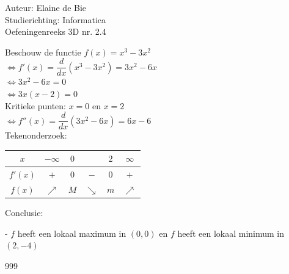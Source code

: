 \documentclass[a4paper]{article}
\begin{document}
  
\noindent \large Auteur: Elaine de Bie \\
\noindent \large Studierichting: Informatica\\
\noindent \large Oefeningenreeks 3D nr. 2.4\\


\medskip


\normalsize



Beschouw de functie $f(x) = x^3 - 3x^2$ \\

$\Leftrightarrow f'(x) = \dfrac{d}{dx}(x^3 - 3x^2) = 3x^2 - 6x$ \\

$\Leftrightarrow 3x^2 - 6x = 0 $ \\

$\Leftrightarrow  3x(x - 2) = 0 $ \\


Kritieke punten: $x = 0$ en $x = 2$ \\

$\Leftrightarrow f''(x) = \dfrac{d}{dx}(3x^2 - 6x) = 6x - 6 $ \\

Tekenonderzoek:

\begin{tabular}{c|ccccc}
$x$			& $-\infty$ & $0$	&  & $2$ & $\infty$   \\ \hline 
$f'(x)$ 	& $+$ & $0$ & $-$ & $0$ & $+$ \\
$f(x)$  	&$\nearrow$ & $M$ &  $\searrow$ & $m$ &$\nearrow$
\end{tabular}

\bigskip

Conclusie: 

- $f$ heeft een lokaal maximum in $(0, 0)$ en $f$ heeft een lokaal minimum in $(2, -4)$



\begin{thebibliography}{999}
\end{thebibliography}
\end{document}

